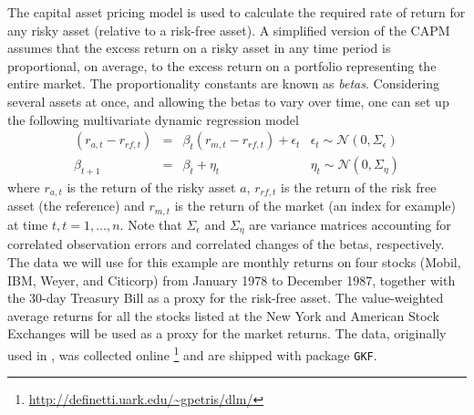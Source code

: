 \documentclass{article}
\newcommand{\GKF}{\texttt{GKF}\xspace}
\begin{document}
The capital asset pricing model is used to calculate the required rate of return for any
risky asset (relative to a risk-free asset). A simplified version of the CAPM assumes that
the excess return on a risky asset in any time period is proportional, on average, to the
excess return on a portfolio representing the entire market. The proportionality constants
are known as \textit{betas}.  Considering several assets at once, and allowing the betas to
vary over time, one can set up the following multivariate dynamic regression model
\begin{equation}
  \begin{array}{rccl}
    (r_{a,t} - r_{rf,t}) & = & \beta_t (r_{m,t} - r_{rf,t}) + \epsilon_t  & \epsilon_t \sim \mathcal{N}(0,\Sigma_{\epsilon}) \\
    \beta_{t+1} & = & \beta_t + \eta_t & \eta_t \sim \mathcal{N}(0,\Sigma_{\eta})
  \end{array}
  \label{eq:CAPM}
\end{equation}
where $r_{a,t}$ is the return of the risky asset $a$, $r_{rf,t}$ is the return of the risk
free asset (the reference) and $r_{m,t}$ is the return of the market (an index for example)
at time $t, t=1,\dots,n$. Note that $\Sigma_\epsilon$ and $\Sigma_\eta$ are variance matrices
accounting for correlated observation errors and correlated changes of the betas,
respectively. The data we will use for this example are monthly returns on four stocks
(Mobil, IBM, Weyer, and Citicorp) from January 1978 to December 1987, together with the
30-day Treasury Bill as a proxy for the risk-free asset. The value-weighted average returns
for all the stocks listed at the New York and American Stock Exchanges will be used as a
proxy for the market returns. The data, originally used in \citet{berndt1991practice}, was
collected online \footnote{\url{http://definetti.uark.edu/~gpetris/dlm/}} and are shipped
with package \GKF.
\end{document}
